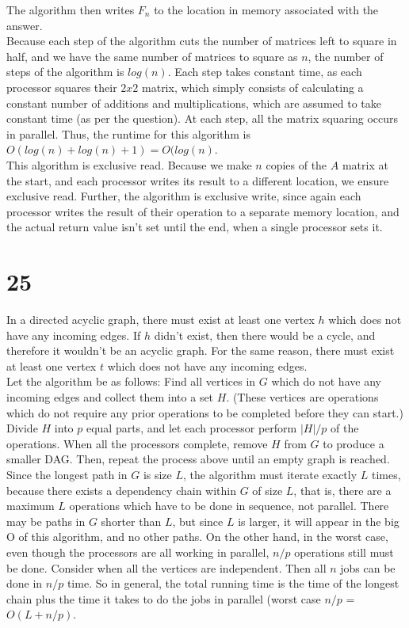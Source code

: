 \documentclass[letterpaper,notitlepage,twoside]{article}
\begin{document}
The algorithm then writes $F_n$ to the location in memory associated with the answer. \\
Because each step of the algorithm cuts the number of matrices left to square in half, and we have the same number of matrices to square as $n$, the number of steps of the algorithm is $log(n)$. Each step takes constant time, as each processor squares their $2x2$ matrix, which simply consists of calculating a constant number of additions and multiplications, which are assumed to take constant time (as per the question). At each step, all the matrix squaring occurs in parallel. Thus, the runtime for this algorithm is $O(log(n) + log(n) + 1) = O(log(n)$. \\
This algorithm is exclusive read. Because we make $n$ copies of the $A$ matrix at the start, and each processor writes its result to a different location, we ensure exclusive read. Further, the algorithm is exclusive write, since again each processor writes the result of their operation to a separate memory location, and the actual return value isn't set until the end, when a single processor sets it. 
\section*{25}
In a directed acyclic graph, there must exist at least one vertex $h$ which does not have any incoming edges. If $h$ didn't exist, then there would be a cycle, and therefore it wouldn't be an acyclic graph. For the same reason, there must exist at least one vertex $t$ which does not have any incoming edges.
\\
Let the algorithm be as follows:
Find all vertices in $G$ which do not have any incoming edges and collect them into a set $H$. (These vertices are operations which do not require any prior operations to be completed before they can start.) Divide $H$ into $p$ equal parts, and let each processor perform $|H|/p$ of the operations. When all the processors complete, remove $H$ from $G$ to produce a smaller DAG. Then, repeat the process above until an empty graph is reached.
\\
Since the longest path in $G$ is size $L$, the algorithm must iterate exactly $L$ times, because there exists a dependency chain within $G$ of size $L$, that is, there are a maximum $L$ operations which have to be done in sequence, not parallel. There may be paths in $G$ shorter than $L$, but since $L$ is larger, it will appear in the big O of this algorithm, and no other paths. On the other hand, in the worst case, even though the processors are all working in parallel, $n/p$ operations still must be done. Consider when all the vertices are independent. Then all $n$ jobs can be done in $n/p$ time. So in general, the total running time is the time of the longest chain plus the time it takes to do the jobs in parallel (worst case $n/p$ = $O(L + n/p)$.
\end{document}
